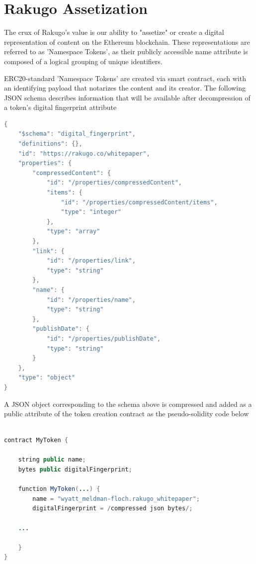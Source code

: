 \documentclass{article}
\begin{document}
\section{Rakugo Assetization}
The crux of Rakugo’s value is our ability to "assetize" or create a digital representation of content on the Ethereum blockchain. These representations are referred to as 'Namespace Tokens', as their publicly accessible name attribute is composed of a logical grouping of unique identifiers.

ERC20-standard 'Namespace Tokens' are created via smart contract, each with an identifying payload that notarizes the content and its creator. The following JSON schema describes information that will be available after decompression of a token’s digital fingerprint attribute

\begin{lstlisting}[language=java]
{
    "$schema": "digital_fingerprint",
    "definitions": {},
    "id": "https://rakugo.co/whitepaper",
    "properties": {
        "compressedContent": {
            "id": "/properties/compressedContent",
            "items": {
                "id": "/properties/compressedContent/items",
                "type": "integer"
            },
            "type": "array"
        },
        "link": {
            "id": "/properties/link",
            "type": "string"
        },
        "name": {
            "id": "/properties/name",
            "type": "string"
        },
        "publishDate": {
            "id": "/properties/publishDate",
            "type": "string"
        }
    },
    "type": "object"
}


\end{lstlisting}

A JSON object corresponding to the schema above is compressed and added as a public attribute of the token creation contract as the pseudo-solidity code below

\begin{minipage}{\linewidth}
\begin{lstlisting}[language=java]

contract MyToken {

    string public name;
    bytes public digitalFingerprint;

    function MyToken(...) {
        name = "wyatt_meldman-floch.rakugo_whitepaper";
        digitalFingerprint = /compressed json bytes/;
        
    ...
    
    }
}
\end{lstlisting}
\end{minipage}
\end{document}
